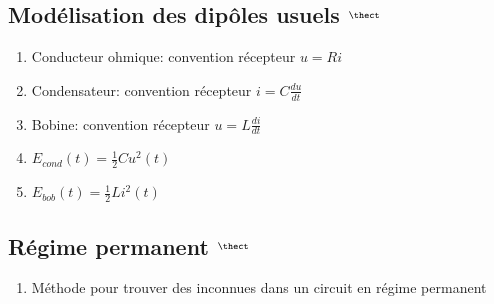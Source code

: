 \documentclass[fleqn]{article}
\theoremstyle{definition} \newtheorem*{defi}{D\'efinition}
\theoremstyle{definition} \newtheorem*{theo}{Th\'eor\`eme}
\theoremstyle{definition} \newtheorem*{coro}{Corollaire}
\theoremstyle{remark} \newtheorem*{rqs}{Remarques}
\theoremstyle{definition} \newtheorem*{prop}{Propri\'et\'e}
\begin{document}
\subsection{Mod\'elisation des dip\^oles usuels $^\thect$}
\begin{enumerate}
	\item Conducteur ohmique: convention r\'ecepteur $u = Ri$
	\item Condensateur: convention r\'ecepteur $i = C\frac{du}{dt}$
	\item Bobine: convention r\'ecepteur $u = L\frac{di}{dt}$
	\item $E_{cond}(t) = \frac{1}{2} Cu^2(t)$
	\item $E_{bob}(t) = \frac{1}{2} Li^2(t)$
\end{enumerate}

\subsection{R\'egime permanent $^{\thect}$}
\begin{enumerate}
	\item M\'ethode pour trouver des inconnues dans un circuit en r\'egime permanent
\end{enumerate}
\end{document}
